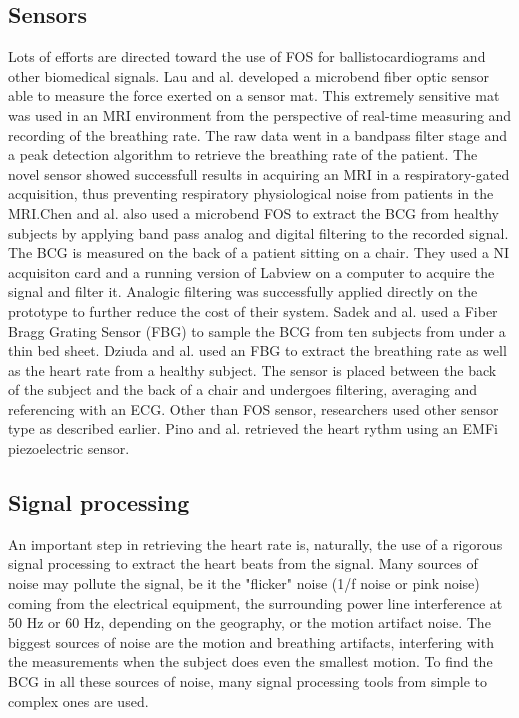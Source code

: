 \documentclass[twoside,onecolumn]{article}
\begin{document}
\subsection{Sensors}
Lots of efforts are directed toward the use of FOS for ballistocardiograms and other biomedical signals. Lau and al. \cite{lau_intensity-modulated_2013} developed a microbend fiber optic sensor able to measure the force exerted on a sensor mat. This extremely sensitive mat was used in an MRI environment from the perspective of real-time measuring and recording of the breathing rate. The raw data went in a bandpass filter stage and a peak detection algorithm to retrieve the breathing rate of the patient. The novel sensor showed successfull results in acquiring an MRI in a respiratory-gated acquisition, thus preventing respiratory physiological noise from patients in the MRI.Chen and al. \cite{chen_portable_2012} also used a microbend FOS to extract the BCG from healthy subjects by applying band pass analog and digital filtering to the recorded signal. The BCG is measured on the back of a patient sitting on a chair. They used a NI acquisiton card and a running version of Labview on a computer to acquire the signal and filter it. Analogic filtering was successfully applied directly on the prototype to further reduce the cost of their system. Sadek and al. \cite{sadek_automatic_2015} used a Fiber Bragg Grating Sensor (FBG) to sample the BCG from ten subjects from under a thin bed sheet.  Dziuda and al. \cite{dziuda_monitoring_2012} used  an FBG to extract the breathing rate as well as the heart rate from a healthy subject. The sensor is placed between the back of the subject and the back of a chair and undergoes filtering, averaging and referencing with an ECG. Other than FOS sensor, researchers used other sensor type as described earlier. Pino and al. \cite{pino_noninvasive_2015} retrieved the heart rythm using an EMFi piezoelectric sensor.

\subsection{Signal processing}
An important step in retrieving the heart rate is, naturally, the use of a rigorous signal processing to extract the heart beats from the signal. Many sources of noise may pollute the signal, be it the "flicker" noise (1/f noise or pink noise) coming from the electrical equipment, the surrounding power line interference at 50 Hz or 60 Hz, depending on the geography, or the motion artifact noise. The biggest sources of noise are the motion and breathing artifacts, interfering with the measurements when the subject does even the smallest motion. To find the BCG in all these sources of noise, many signal processing tools from simple to complex ones are used.
\end{document}
